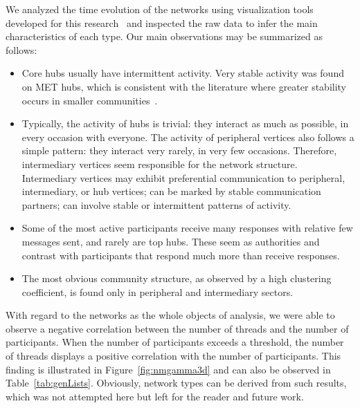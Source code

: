 \documentclass[%
	aip,
	jmp,%
	amsmath,amssymb,
	reprint,%
]{revtex4-1}
\begin{document}
We analyzed the time evolution of the networks using visualization tools developed for this research~\cite{rcText,versinus} and inspected the raw data to infer the main characteristics of each type. Our main observations may be summarized as follows:
\begin{itemize}
	\item Core hubs usually have intermittent activity. Very stable activity was found on MET hubs, which is consistent with the literature where greater stability occurs in smaller communities~\cite{barabasiEvo}.
	\item Typically, the activity of hubs is trivial: they interact as much as possible, in every occasion with everyone. The activity of peripheral vertices also follows a simple pattern: they interact very rarely, in very few occasions. Therefore, intermediary vertices seem responsible for the network structure. Intermediary vertices may exhibit preferential communication to peripheral, intermediary, or hub vertices; can be marked by stable communication partners; can involve stable or intermittent patterns of activity.
	\item Some of the most active participants receive many responses with relative few messages sent, and rarely are top hubs. These seem as authorities and contrast with participants that respond much more than receive responses.
	\item The most obvious community structure, as observed by a high clustering coefficient, is found only in peripheral and intermediary sectors.
\end{itemize}

With regard to the networks as the whole objects of analysis,
we were able to observe a negative correlation between the number of threads and the number of participants.
When the number of participants exceeds a threshold,
the number of threads displays a positive correlation with the number of participants.
This finding is illustrated in Figure~\ref{fig:nmgamma3d} and can also be observed in Table~\ref{tab:genLists}.
Obviously, network types can be derived from such results, which was not attempted here but 
left for the reader and future work. 
\end{document}
